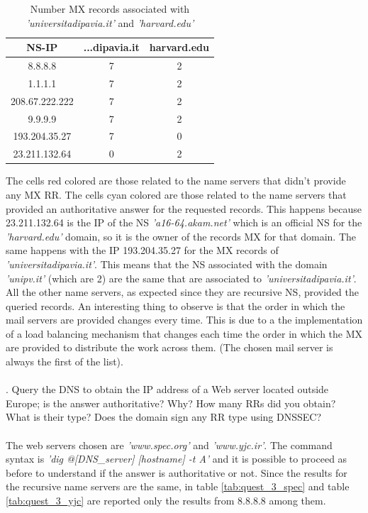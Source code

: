 \documentclass[a4paper,10pt]{article}
\begin{document}
\begin{multicols}{2}
        \begin{table}[H]
                \centering
                \caption{\small Number MX records associated with \textit{'universitadipavia.it'} and \textit{'harvard.edu'}}
                \vspace{0.3cm}
                \begin{tabular}{|c|c|c|}
                \hline
                \textbf{NS-IP} & \textbf{...dipavia.it} & \textbf{harvard.edu} \\ \hline
                {8.8.8.8} & 7 & 2 \\ \hline
                {1.1.1.1} & 7 & 2 \\ \hline
                {208.67.222.222} & 7 & 2 \\ \hline
                {9.9.9.9} & 7 & 2 \\ \hline
                {193.204.35.27} & \cellcolor{cyan} 7 & \cellcolor{red} 0 \\ \hline
                {23.211.132.64} & \cellcolor{red} 0 & \cellcolor{cyan} 2 \\ \hline
                \end{tabular}
                \label{tab:quest_2}
        \end{table}
\noindent
The cells red colored are those related to the name servers that didn't provide any MX RR. The cells cyan colored are those related to the name servers that provided an authoritative
answer for the requested records. This happens because 23.211.132.64 is the IP of the NS \textit{'a16-64.akam.net'} which is an official NS for the \textit{'harvard.edu'} domain, so it is
the owner of the records MX for that domain. The same happens with the IP 193.204.35.27 for the MX records of \textit{'universitadipavia.it'}. This means that the NS associated with the domain \textit{'unipv.it'} (which are 2)
are the same that are associated to \textit{'universitadipavia.it'}. All the other name servers, as expected since they are recursive NS, provided the queried records. 
An interesting thing to observe is that the order in which the mail servers are provided changes every time. This is due to a the implementation of a load balancing mechanism that 
changes each time the order in which the MX are provided to distribute the work across them. (The chosen mail server is always the first of the list).  \\
\\
. Query the DNS to obtain the IP address of a Web server located outside Europe; is the answer authoritative? Why? How many RRs did you obtain? What is their type? 
Does the domain sign any RR type using DNSSEC?\\
\\
The web servers chosen are \textit{'www.spec.org'} and \textit{'www.yjc.ir'}. The command syntax is \textit{'dig @[DNS\_server] [hostname] -t A'} and it is possible to 
proceed as before to understand if the answer is authoritative or not. Since the results for the recursive name servers are the same, in table \ref{tab:quest_3_spec} and table \ref{tab:quest_3_yjc}
are reported only the results from 8.8.8.8 among them.


\end{multicols}
\end{document}
